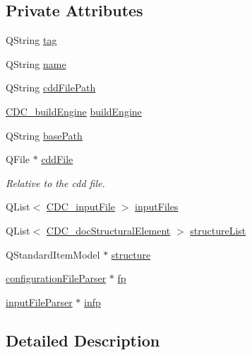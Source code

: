 \subsection*{Private Attributes}
\begin{DoxyCompactItemize}
\item 
Q\+String \hyperlink{classdocument_worker_a06432e8a28e33071cbb02d7739558ab0}{tag}
\item 
Q\+String \hyperlink{classdocument_worker_af67a64425e1e24d88333afda12eb4d1d}{name}
\item 
Q\+String \hyperlink{classdocument_worker_ad2f131c1430b72e3eab8b5cc9a6e920e}{cdd\+File\+Path}
\item 
\hyperlink{cdcdefs_8h_abd38cc943467f0d66216a60454d5ee06}{C\+D\+C\+\_\+build\+Engine} \hyperlink{classdocument_worker_ab5c27d8e6fd6d96d881d84259dc3538a}{build\+Engine}
\item 
Q\+String \hyperlink{classdocument_worker_a7e7c868c0d0132c45e240eb5e08bbf09}{base\+Path}
\item 
Q\+File $\ast$ \hyperlink{classdocument_worker_ae5dabdc7bbf00675b9a2ed4541e43d63}{cdd\+File}
\begin{DoxyCompactList}\small\item\em Relative to the cdd file. \end{DoxyCompactList}\item 
Q\+List$<$ \hyperlink{structdocument_worker_1_1_c_d_c__input_file}{C\+D\+C\+\_\+input\+File} $>$ \hyperlink{classdocument_worker_a5812c9d02689c044852beb5904c24e82}{input\+Files}
\item 
Q\+List$<$ \hyperlink{struct_c_d_c__doc_structural_element}{C\+D\+C\+\_\+doc\+Structural\+Element} $>$ \hyperlink{classdocument_worker_a18623c1f7f73e476f7c82a02e9752469}{structure\+List}
\item 
Q\+Standard\+Item\+Model $\ast$ \hyperlink{classdocument_worker_af05a07271fc523897d0154400f6dddb0}{structure}
\item 
\hyperlink{classconfiguration_file_parser}{configuration\+File\+Parser} $\ast$ \hyperlink{classdocument_worker_a1825443dff2970960623c0b1979ce85f}{fp}
\item 
\hyperlink{classinput_file_parser}{input\+File\+Parser} $\ast$ \hyperlink{classdocument_worker_a0568a560290f197dcb16ebdb15593e3b}{infp}
\end{DoxyCompactItemize}


\subsection{Detailed Description}


